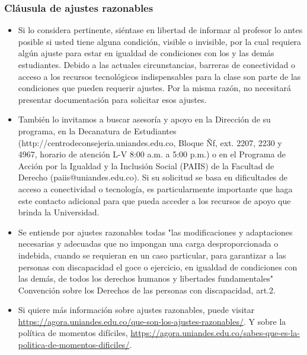 \documentclass[
  shownotes,
  xcolor={svgnames},
  hyperref={colorlinks,citecolor=DarkBlue,linkcolor=DarkRed,urlcolor=DarkBlue}
  , aspectratio=169]{beamer}
\begin{document}
\begin{frame}
\frametitle{Cláusula de ajustes razonables}

\begin{itemize}
  \scriptsize
\item  Si lo considera pertinente, siéntase en libertad de informar al profesor lo antes posible si usted tiene alguna condición, visible o invisible, por la cual requiera algún ajuste para estar en igualdad de condiciones con los y las demás estudiantes. Debido a las actuales circunstancias, barreras de conectividad o acceso a los recursos tecnológicos indispensables para la clase son parte de las condiciones que pueden requerir ajustes. Por la misma razón, no necesitará presentar documentación para solicitar esos ajustes.

\item  También lo invitamos a buscar asesoría y apoyo en la Dirección de su programa, en la Decanatura de Estudiantes (http://centrodeconsejeria.uniandes.edu.co, Bloque Ñf, ext. 2207, 2230 y 4967, horario de atención L-V 8:00 a.m. a 5:00 p.m.) o en el Programa de Acción por la Igualdad y la Inclusión Social (PAIIS) de la Facultad de Derecho (paiis@uniandes.edu.co). Si su solicitud se basa en dificultades de acceso a conectividad o tecnología, es particularmente importante que haga este contacto adicional para que pueda acceder a los recursos de apoyo que brinda la Universidad.

\item  Se entiende por ajustes razonables todas "las modificaciones y adaptaciones necesarias y adecuadas que no impongan una carga desproporcionada o indebida, cuando se requieran en un caso particular, para garantizar a las personas con discapacidad el goce o ejercicio, en igualdad de condiciones con las demás, de todos los derechos humanos y libertades fundamentales" Convención sobre los Derechos de las personas con discapacidad, art.2.
\item Si quiere más información sobre ajustes razonables, puede visitar \href{esta página de la DECA}{https://agora.uniandes.edu.co/que-son-los-ajustes-razonables/}. Y sobre la política de momentos difíciles, \href{esta otra}{https://agora.uniandes.edu.co/sabes-que-es-la-politica-de-momentos-dificiles/}.

\end{itemize}
\end{frame}
\end{document}
